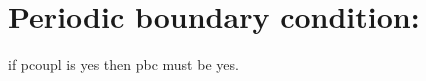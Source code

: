 \documentclass[letterpaper,10pt,english]{sphinxmanual}
\begin{document}
\begin{sphinxVerbatim}[commandchars=\\\{\}]
 
             \PYG{p}{[}\PYG{p}{]}           
\end{sphinxVerbatim}


\section{Periodic boundary condition:}
\label{\detokenize{usage/simulation_control:periodic-boundary-condition}}
\sphinxAtStartPar
if pcoupl is yes then pbc must be yes.
\end{document}
